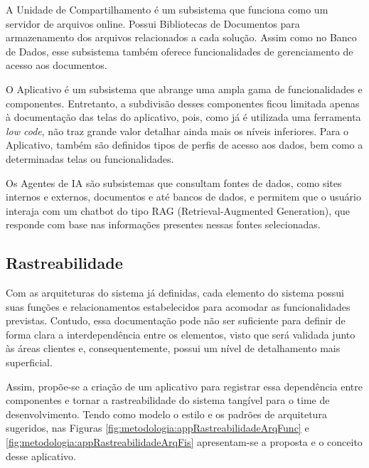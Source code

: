 	A Unidade de Compartilhamento é um subsistema que funciona como um servidor de arquivos online. Possui Bibliotecas de Documentos para armazenamento dos arquivos relacionados a cada solução. Assim como no Banco de Dados, esse subsistema também oferece funcionalidades de gerenciamento de acesso aos documentos.

	O Aplicativo é um subsistema que abrange uma ampla gama de funcionalidades e componentes. Entretanto, a subdivisão desses componentes ficou limitada apenas à documentação das telas do aplicativo, pois, como já é utilizada uma ferramenta \textit{low code}, não traz grande valor detalhar ainda mais os níveis inferiores. Para o Aplicativo, também são definidos tipos de perfis de acesso aos dados, bem como a determinadas telas ou funcionalidades.

	Os Agentes de IA são subsistemas que consultam fontes de dados, como sites internos e externos, documentos e até bancos de dados, e permitem que o usuário interaja com um chatbot do tipo RAG (Retrieval-Augmented Generation), que responde com base nas informações presentes nessas fontes selecionadas.


	\subsection{Rastreabilidade}

	Com as arquiteturas do sistema já definidas, cada elemento do sistema possui suas funções e relacionamentos estabelecidos para acomodar as funcionalidades previstas. Contudo, essa documentação pode não ser suficiente para definir de forma clara a interdependência entre os elementos, visto que será validada junto às áreas clientes e, consequentemente, possui um nível de detalhamento mais superficial.

	Assim, propõe-se a criação de um aplicativo para registrar essa dependência entre componentes e tornar a rastreabilidade do sistema tangível para o time de desenvolvimento. Tendo como modelo o estilo e os padrões de arquitetura sugeridos, nas Figuras \ref{fig:metodologia:appRastreabilidadeArqFunc} e \ref{fig:metodologia:appRastreabilidadeArqFis} apresentam-se a proposta e o conceito desse aplicativo.

